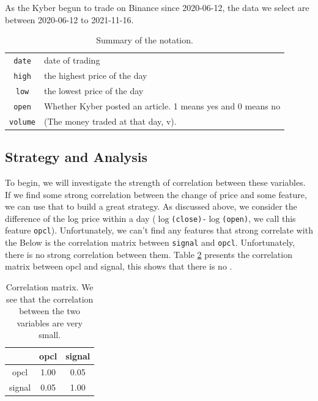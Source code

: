 \documentclass[twoside]{report}
\newcommand{\code}{\texttt}
\begin{document}
\begin{spacing}{1}
As the Kyber begun to trade on Binance since 2020-06-12, the data we select are between 2020-06-12 to 2021-11-16.


\begin{table}[h]
    \centering
    \begin{tabular}{cl} 
        \hline
        \code{date}  & date of trading \\
        \code{high} & the highest price of the day\\
       \code{low}& the lowest price of the day\\
         \code{open} & Whether Kyber posted an article.  1 means yes and 0 means no \\
        \code{volume} & (The money traded at that day, v).\\ \hline
    \end{tabular}\vspace{2mm}
    \caption{Summary of the notation.}
    \label{tab:feature}
\end{table}













\subsection{Strategy and Analysis}
To begin, we will investigate the strength of correlation between these variables. If we find some strong correlation between the change of price and some feature, we can use that to build a great strategy. As discussed above, we consider the difference of the log price within a day (\code{$\log$(close)-$\log$(open)}, we call this feature \code{opcl}). Unfortunately, we can't find any features that strong correlate with the  Below is the correlation matrix between \code{signal} and \code{opcl}. Unfortunately, there is no strong correlation between them. Table  \ref{tab:corrMatrixOpclSignal} presents the correlation matrix between opcl and signal, this shows that there is no . 

\begin{table}[!htbp]
    \centering
    \begin{tabular}{|c|c|c|}
    \hline
         & opcl &  signal \\ \hline
        opcl & 1.00 & 0.05\\ \hline
        signal & 0.05& 1.00\\ \hline
    \end{tabular}
    \caption{Correlation matrix. We see that the correlation between the two variables are very small.}
    \label{tab:corrMatrixOpclSignal}
\end{table}



\end{spacing}
\end{document}
